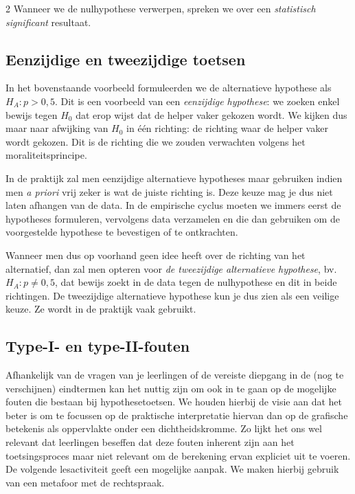\begin{multicols}{2}
Wanneer we de nulhypothese verwerpen, spreken we over een \emph{statistisch significant} resultaat. 

\subsection*{Eenzijdige en tweezijdige toetsen}
In het bovenstaande voorbeeld formuleerden we de alternatieve hypothese als $H_A:  p > 0,5$. Dit is een voorbeeld van een \emph{eenzijdige hypothese}: we zoeken enkel bewijs tegen $H_0$ dat erop wijst dat de helper vaker gekozen wordt. We kijken dus maar naar afwijking van $H_0$ in één richting: de richting waar de helper vaker wordt gekozen. Dit is de richting die we zouden verwachten volgens het moraliteitsprincipe.

In de praktijk zal men eenzijdige alternatieve hypotheses maar gebruiken indien men \emph{a priori} vrij zeker is wat de juiste richting is. Deze keuze mag je dus niet laten afhangen van de data. In de empirische cyclus moeten we immers eerst de hypotheses formuleren, vervolgens data verzamelen en die dan gebruiken om de voorgestelde hypothese te bevestigen of te ontkrachten. 

Wanneer men dus op voorhand geen idee heeft over de richting van het alternatief, dan zal men opteren voor \emph{de tweezijdige alternatieve hypothese}, bv. $H_A: p \neq 0,5$, dat bewijs zoekt in de data tegen de nulhypothese en dit in beide richtingen. De tweezijdige alternatieve hypothese kun je dus zien als een veilige keuze. Ze wordt in de praktijk vaak gebruikt. 

\subsection*{Type-I- en type-II-fouten}

Afhankelijk van de vragen van je leerlingen of de vereiste diepgang in de (nog te verschijnen) eindtermen kan het nuttig zijn om ook in te gaan op de mogelijke fouten die bestaan bij hypothesetoetsen. We houden hierbij de visie aan dat het beter is om te focussen op de praktische interpretatie hiervan dan op de grafische betekenis als oppervlakte onder een dichtheidskromme. Zo lijkt het ons wel relevant dat leerlingen beseffen dat deze fouten inherent zijn aan het toetsingsproces maar niet relevant om de berekening ervan expliciet uit te voeren. De volgende lesactiviteit geeft een mogelijke aanpak. We maken hierbij gebruik van een metafoor met de rechtspraak.

\end{multicols}

